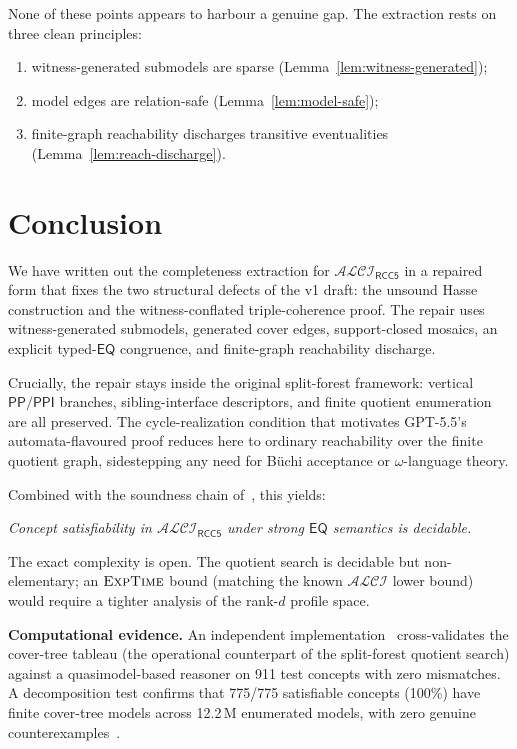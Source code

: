 \documentclass[11pt]{article}
\theoremstyle{definition}
\theoremstyle{remark}
\newcommand{\PP}{\mathsf{PP}}
\newcommand{\PPI}{\mathsf{PPI}}
\newcommand{\EQ}{\mathsf{EQ}}
\newcommand{\ALCIRCC}[1]{\mathcal{ALCI}_{\mathsf{RCC#1}}}
\begin{document}
None of these points appears to harbour a genuine gap.  The
extraction rests on three clean principles:
\begin{enumerate}
\item witness-generated submodels are sparse
  (Lemma~\ref{lem:witness-generated});
\item model edges are relation-safe
  (Lemma~\ref{lem:model-safe});
\item finite-graph reachability discharges transitive eventualities
  (Lemma~\ref{lem:reach-discharge}).
\end{enumerate}


\section{Conclusion}
\label{sec:conclusion}

We have written out the completeness extraction for $\ALCIRCC{5}$
in a repaired form that fixes the two structural defects of the
v1 draft: the unsound Hasse construction and the witness-conflated
triple-coherence proof.  The repair uses witness-generated
submodels, generated cover edges, support-closed mosaics, an
explicit typed-$\EQ$ congruence, and finite-graph reachability
discharge.

Crucially, the repair stays inside the original split-forest
framework: vertical $\PP/\PPI$ branches, sibling-interface
descriptors, and finite quotient enumeration are all preserved.
The cycle-realization condition that motivates GPT-5.5's
automata-flavoured proof reduces here to ordinary reachability
over the finite quotient graph, sidestepping any need for B\"uchi
acceptance or $\omega$-language theory.

Combined with the soundness chain
of~\cite{SplitForest,GPT55Generated}, this yields:

\begin{center}
\emph{Concept satisfiability in $\ALCIRCC{5}$ under strong $\EQ$
semantics is decidable.}
\end{center}

The exact complexity is open.  The quotient search is decidable but
non-elementary; an $\textsc{ExpTime}$ bound (matching the known
$\mathcal{ALCI}$ lower bound) would require a tighter analysis
of the rank-$d$ profile space.

\medskip
\noindent\textbf{Computational evidence.}\;
An independent implementation~\cite{ClaudeImpl} cross-validates
the cover-tree tableau (the operational counterpart of the
split-forest quotient search) against a quasimodel-based reasoner
on 911 test concepts with zero mismatches.  A decomposition test
confirms that 775/775 satisfiable concepts (100\%) have finite
cover-tree models across 12.2\,M enumerated models, with zero
genuine counterexamples~\cite{StressTestCoverTree,
DecompositionTest}.
\end{document}
